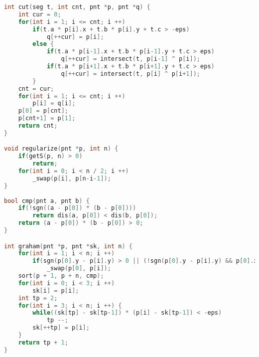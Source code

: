 \begin{lstlisting}[language=c++]
int cut(seg t, int cnt, pnt *p, pnt *q) {
    int cur = 0;
    for(int i = 1; i <= cnt; i ++) 
        if(t.a * p[i].x + t.b * p[i].y + t.c > -eps)
            q[++cur] = p[i];
        else {
            if(t.a * p[i-1].x + t.b * p[i-1].y + t.c > eps)
                q[++cur] = intersect(t, p[i-1] ^ p[i]);
            if(t.a * p[i+1].x + t.b * p[i+1].y + t.c > eps)
                q[++cur] = intersect(t, p[i] ^ p[i+1]);
        }
    cnt = cur;
    for(int i = 1; i <= cnt; i ++)
        p[i] = q[i];
    p[0] = p[cnt];
    p[cnt+1] = p[1];
    return cnt;
}

void regularize(pnt *p, int n) {
    if(getS(p, n) > 0)
        return;
    for(int i = 0; i < n / 2; i ++)
        _swap(p[i], p[n-i-1]);
}
    
bool cmp(pnt a, pnt b) {
    if(!sgn((a - p[0]) * (b - p[0])))
        return dis(a, p[0]) < dis(b, p[0]);
    return (a - p[0]) * (b - p[0]) > 0;
}

int graham(pnt *p, pnt *sk, int n) {
    for(int i = 1; i < n; i ++)
        if(sgn(p[0].y - p[i].y) > 0 || (!sgn(p[0].y - p[i].y) && p[0].x > p[i].x))
            _swap(p[0], p[i]);
    sort(p + 1, p + n, cmp);
    for(int i = 0; i < 3; i ++)
        sk[i] = p[i];
    int tp = 2;
    for(int i = 3; i < n; i ++) {
        while((sk[tp] - sk[tp-1]) * (p[i] - sk[tp-1]) < -eps)
            tp --;
        sk[++tp] = p[i];
    }
    return tp + 1;
}
    \end{lstlisting}
